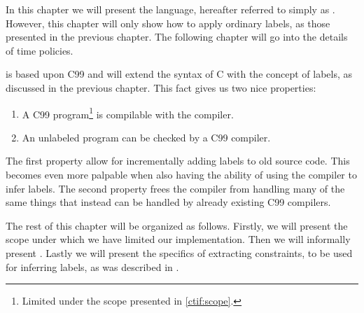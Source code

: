 
In this chapter we will present the \thelanglong{} language, hereafter referred to simply as \thelang.
However, this chapter will only show how to apply ordinary labels, as those presented in the previous chapter.
The following chapter will go into the details of time policies.

\thelang{} is based upon C99 and will extend the syntax of C with the concept of labels, as discussed in the previous chapter.
This fact gives us two nice properties:
\begin{enumerate}
  \item A C99 program\footnote{Limited under the scope presented in \cref{ctif:scope}.} is compilable with the \thelang{} compiler.
  \item An unlabeled \thelang{} program can be checked by a C99 compiler.
\end{enumerate}
The first property allow for incrementally adding labels to old source code.
This becomes even more palpable when also having the ability of using the \thelang{} compiler to infer labels.
The second property frees the \thelang{} compiler from handling many of the same things that instead can be handled by already existing C99 compilers.

The rest of this chapter will be organized as follows.
Firstly, we will present the scope under which we have limited our implementation.
Then we will informally present \thelang.
Lastly we will present the specifics of extracting constraints, to be used for inferring labels, as was described in .
